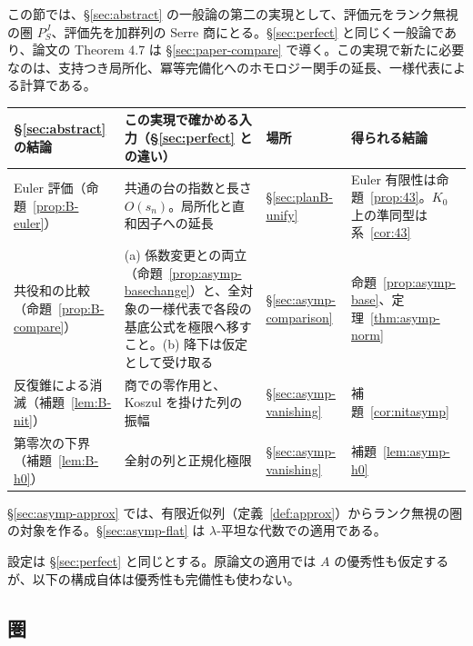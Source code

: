 \documentclass[11pt,a4paper]{ltjsarticle}
\numberwithin{equation}{section}
\theoremstyle{plain}
\theoremstyle{definition}
\theoremstyle{definition}
\begin{document}
この節では、§\ref{sec:abstract} の一般論の第二の実現として、評価元をランク無視の圏 $P_S^J$、評価先を加群列の Serre 商にとる。§\ref{sec:perfect} と同じく一般論であり、論文の Theorem 4.7 は §\ref{sec:paper-compare} で導く。この実現で新たに必要なのは、支持つき局所化、冪等完備化へのホモロジー関手の延長、一様代表による計算である。
\begin{center}
\small
\begin{tabularx}{\textwidth}{>{\raggedright}p{3.0cm}>{\raggedright}X>{\raggedright}p{1.6cm}>{\raggedright\arraybackslash}p{3.0cm}}
\toprule
§\ref{sec:abstract} の結論 & この実現で確かめる入力（§\ref{sec:perfect} との違い） & 場所 & 得られる結論 \\
\midrule
Euler 評価（命題~\ref{prop:B-euler}） & 共通の台の指数と長さ $O(s_n)$。局所化と直和因子への延長 & §\ref{sec:planB-unify} & Euler 有限性は命題~\ref{prop:43}。$K_0$ 上の準同型は系~\ref{cor:43} \\
共役和の比較（命題~\ref{prop:B-compare}） & (a) 係数変更との両立（命題~\ref{prop:asymp-basechange}）と、全対象の一様代表で各段の基底公式を極限へ移すこと。(b) 降下は仮定として受け取る & §\ref{sec:asymp-comparison} & 命題~\ref{prop:asymp-base}、定理~\ref{thm:asymp-norm} \\
反復錐による消滅（補題~\ref{lem:B-nit}） & 商での零作用と、Koszul を掛けた列の振幅 & §\ref{sec:asymp-vanishing} & 補題~\ref{cor:nitasymp} \\
第零次の下界（補題~\ref{lem:B-h0}） & 全射の列と正規化極限 & §\ref{sec:asymp-vanishing} & 補題~\ref{lem:asymp-h0} \\
\bottomrule
\end{tabularx}
\end{center}
§\ref{sec:asymp-approx} では、有限近似列（定義~\ref{def:approx}）からランク無視の圏の対象を作る。§\ref{sec:asymp-flat} は $\lambda$-平坦な代数での適用である。

設定は §\ref{sec:perfect} と同じとする。原論文の適用では $A$ の優秀性も仮定するが、以下の構成自体は優秀性も完備性も使わない。

\subsection{圏}\label{sec:asymp-cat}
\end{document}
